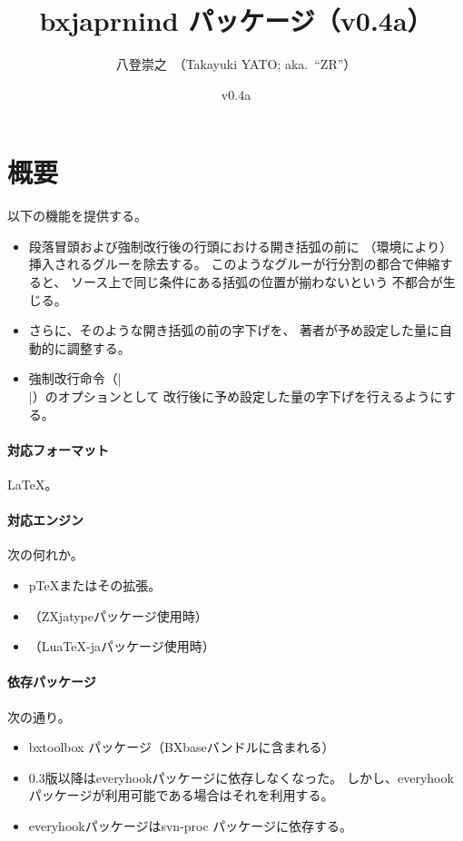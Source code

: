 \documentclass[a4paper]{ltjsarticle}
\newcommand{\PkgVersion}{0.4a}
\newcommand{\PkgDate}{2021/06/18}
\newcommand{\Pkg}[1]{\textsf{#1}}
\providecommand{\pTeX}{p\TeX}
\begin{document}
\title{\Pkg{bxjaprnind} パッケージ（v\PkgVersion）}
\author{八登崇之\ （Takayuki YATO; aka.~``ZR''）}
\date{v\PkgVersion\quad[\PkgDate]}
\maketitle

\section{概要}
\label{sec:Overview}

以下の機能を提供する。
\begin{itemize}
\item 段落冒頭および強制改行後の行頭における開き括弧の前に
  （環境により）挿入されるグルーを除去する。
  このようなグルーが行分割の都合で伸縮すると、
  ソース上で同じ条件にある括弧の位置が揃わないという
  不都合が生じる。
\item さらに、そのような開き括弧の前の字下げを、
  著者が予め設定した量に自動的に調整する。
\item 強制改行命令（|\\|）のオプションとして
  改行後に予め設定した量の字下げを行えるようにする。
\end{itemize}

\paragraph{対応フォーマット} \LaTeX。

\paragraph{対応エンジン} 次の何れか。
\begin{itemize}
\item {\pTeX}またはその拡張。
\item {\XeTeX}（\Pkg{ZXjatype}パッケージ使用時）
\item {\LuaTeX}（\Pkg{LuaTeX-ja}パッケージ使用時）
\end{itemize}

\paragraph{依存パッケージ} 次の通り。
\begin{itemize}
\item \Pkg{bxtoolbox} パッケージ（\Pkg{BXbase}バンドルに含まれる）
\item 0.3版以降は\Pkg{everyhook}パッケージに依存しなくなった。
しかし、\Pkg{everyhook}パッケージが利用可能である場合はそれを利用する。
\item \Pkg{everyhook}パッケージは\Pkg{svn-proc} パッケージに依存する。
\end{itemize}
\end{document}
